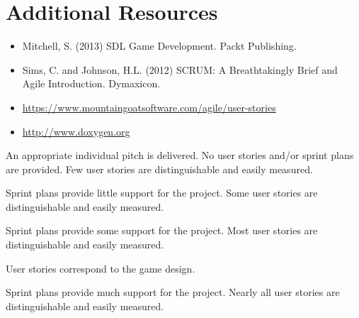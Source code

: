\documentclass{../fal_assignment}
\begin{document}
\section*{Additional Resources}

\begin{itemize}
    \item Mitchell, S. (2013) SDL Game Development. Packt Publishing.
    \item Sims, C. and Johnson, H.L. (2012) SCRUM: A Breathtakingly Brief and Agile Introduction. Dymaxicon.
    \item \url{https://www.mountaingoatsoftware.com/agile/user-stories}
    \item \url{http://www.doxygen.org}
\end{itemize}

\begin{markingrubric}
        \grade An appropriate individual pitch is delivered.
        \grade\fail No user stories and/or sprint plans are provided.
        \grade Few user stories are distinguishable and easily measured.
            \par Sprint plans provide little support for the project.
        \grade Some user stories are distinguishable and easily measured.
            \par Sprint plans provide some support for the project.
        \grade Most user stories are distinguishable and easily measured.
            \par User stories correspond to the game design.
            \par Sprint plans provide much support for the project.
        \grade Nearly all user stories are distinguishable and easily measured.

\end{markingrubric}
\end{document}
